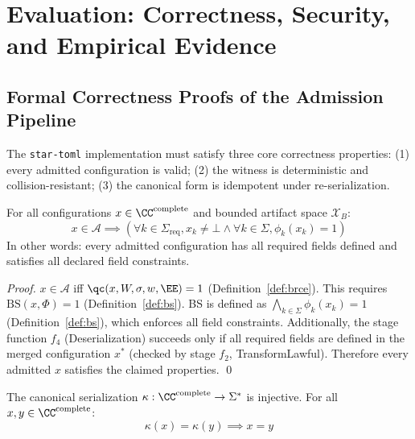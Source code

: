 
\chapter{Evaluation: Correctness, Security, and Empirical Evidence}
\label{ch:evaluation}

\section{Formal Correctness Proofs of the Admission Pipeline}

The \texttt{star-toml} implementation must satisfy three core correctness properties:
(1) every admitted configuration is valid;
(2) the witness is deterministic and collision-resistant;
(3) the canonical form is idempotent under re-serialization.

\begin{theorem}
\label{thm:admission-validity}
For all configurations $x \in \CC^{\mathrm{complete}}$ and bounded artifact space $\mathcal{X}_B$:
\[
  x \in \mathcal{A} \implies
  \left(
    \forall k \in \Sigma_{\mathrm{req}}, x_k \neq \bot
    \land \forall k \in \Sigma, \phi_k(x_k) = 1
  \right)
\]
In other words: every admitted configuration has all required fields defined
and satisfies all declared field constraints.
\end{theorem}

\begin{proof}
$x \in \mathcal{A}$ iff $\qc(x, W, \sigma, w, \EE) = 1$ (Definition~\ref{def:brce}).
This requires $\mathrm{BS}(x, \Phi) = 1$ (Definition~\ref{def:bs}).
BS is defined as $\bigwedge_{k \in \Sigma} \phi_k(x_k) = 1$ (Definition~\ref{def:bs}),
which enforces all field constraints.
Additionally, the stage function $f_4$ (Deserialization) succeeds only if
all required fields are defined in the merged configuration $x^*$
(checked by stage $f_2$, TransformLawful).
Therefore every admitted $x$ satisfies the claimed properties. \qed
\end{proof}

\begin{theorem}
\label{thm:canonical-injectivity}
The canonical serialization $\kappa : \CC^{\mathrm{complete}} \to \Sigma^*$
is injective. For all $x, y \in \CC^{\mathrm{complete}}$:
\[
  \kappa(x) = \kappa(y) \implies x = y
\]
\end{theorem}

